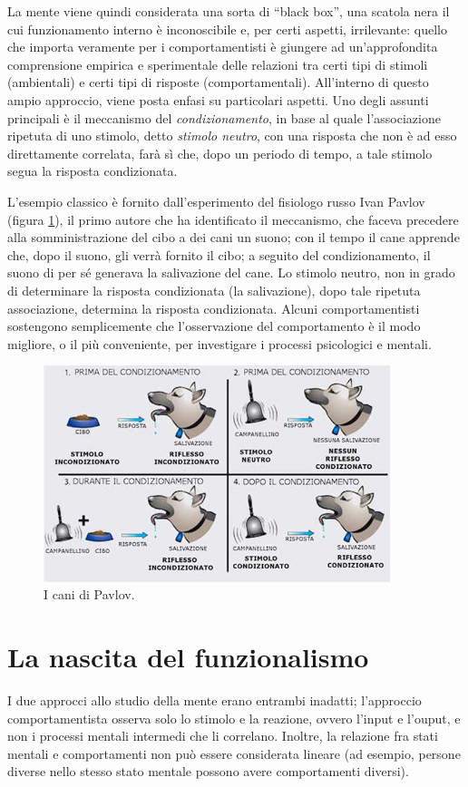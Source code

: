 La mente viene quindi considerata una sorta di ``black box'', una scatola nera il cui funzionamento interno è inconoscibile e, per certi aspetti, irrilevante: quello che importa veramente per i comportamentisti è giungere ad un'approfondita comprensione empirica e sperimentale delle relazioni tra certi tipi di stimoli (ambientali) e certi tipi di risposte (comportamentali). All'interno di questo ampio approccio, viene posta enfasi su particolari aspetti. Uno degli assunti principali è il meccanismo del \emph{condizionamento}, in base al quale l'associazione ripetuta di uno stimolo, detto \emph{stimolo neutro}, con una risposta che non è ad esso direttamente correlata, farà sì che, dopo un periodo di tempo, a tale stimolo segua la risposta condizionata.

L'esempio classico è fornito dall'esperimento del fisiologo russo Ivan Pavlov (figura \ref{fig:pavlov}), il primo autore che ha identificato il meccanismo, che faceva precedere alla somministrazione del cibo a dei cani un suono; con il tempo il cane apprende che, dopo il suono, gli verrà fornito il cibo; a seguito del condizionamento, il suono di per sé generava la salivazione del cane. Lo stimolo neutro, non in grado di determinare la risposta condizionata (la salivazione), dopo tale ripetuta associazione, determina la risposta condizionata. Alcuni comportamentisti sostengono semplicemente che l'osservazione del comportamento è il modo migliore, o il più conveniente, per investigare i processi psicologici e mentali.

\begin{figure}[hbt]
  \centering
  \includegraphics[width=0.9\textwidth]{img/cani_Pavlov.jpg}
  \caption{I cani di Pavlov.}
  \label{fig:pavlov}
\end{figure}

\section{La nascita del funzionalismo}
I due approcci allo studio della mente erano entrambi inadatti; l’approccio comportamentista osserva solo lo stimolo e la reazione, ovvero l’input e l’ouput, e non i processi mentali intermedi che li correlano. Inoltre, la relazione fra stati mentali e comportamenti non può essere considerata lineare (ad esempio, persone diverse nello stesso stato mentale possono avere comportamenti diversi).

